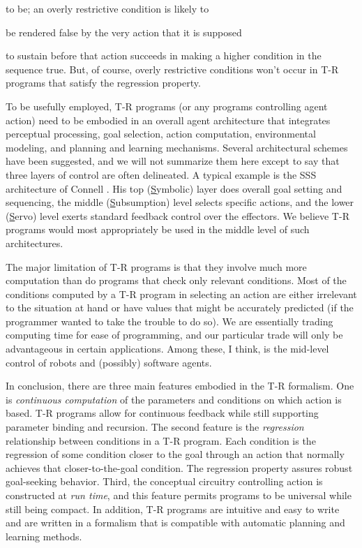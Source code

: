 to be; an overly restrictive condition is likely to 

 be rendered false by the very action that it is supposed 

to sustain before that action succeeds in making a higher condition in the  
sequence true.  But, of course, overly restrictive conditions won't occur in  
T-R programs that satisfy the regression property.

To be usefully employed, T-R programs (or any programs controlling agent  
action) need to be embodied in an overall agent architecture that integrates  
perceptual processing, goal selection, action computation, environmental  
modeling, and planning and learning mechanisms.  Several architectural  
schemes have been suggested, and we will not summarize them here except to  
say that three layers of control are often delineated.  A typical example is  
the SSS architecture of Connell \cite{Connell}.  His top  
(\underline{S}ymbolic) layer does overall goal setting and sequencing, the  
middle (\underline{S}ubsumption) level selects specific actions, and the  
lower (\underline{S}ervo) level exerts standard feedback control over the  
effectors.  We believe T-R programs would most appropriately be used in the  
middle  level of such architectures.

The major limitation of T-R programs is that they involve much more  
computation than do programs that check only relevant conditions.  Most of  
the conditions computed by a T-R program in selecting an action are either  
irrelevant to the situation at hand or have values that might be accurately  
predicted (if the programmer wanted to take the trouble to do so).  We are  
essentially trading computing time for ease of programming, and our  
particular trade will only be advantageous in certain applications.  Among  
these, I think, is the mid-level control of robots and (possibly) software  
agents.


In conclusion, there are three main features embodied in the T-R formalism.   
One is {\it continuous computation} of the parameters and conditions on which  
action is based.  T-R programs allow for continuous feedback while still  
supporting parameter binding and recursion.   The second feature is the {\it  
regression} relationship between conditions in a T-R program.  Each condition  
is the regression of some condition closer to the goal through an action that  
normally achieves that closer-to-the-goal condition.  The regression property  
assures robust goal-seeking behavior.  Third, the conceptual circuitry  
controlling action is constructed at {\it run time}, and this feature permits  
programs to be universal while still being compact.  In addition, T-R  
programs are intuitive and easy to write and are written in a formalism that  
is compatible with automatic planning and learning methods.

